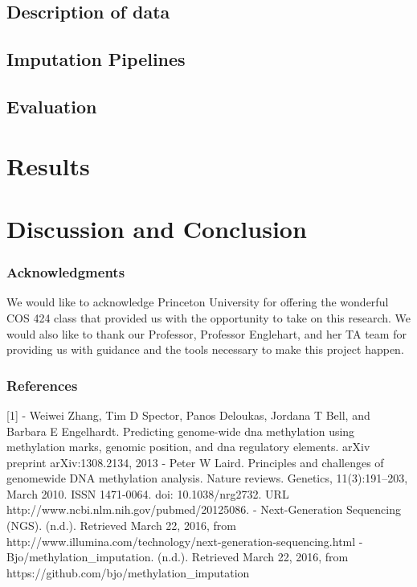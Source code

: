 \documentclass{article} %
\begin{document}
\subsection{Description of data}
\subsection{Imputation Pipelines}
\subsection{Evaluation}
\section{Results}
\section{Discussion and Conclusion}
\subsubsection*{Acknowledgments}
We would like to acknowledge Princeton University for offering the wonderful COS 424 class that provided us with the opportunity to take on this research. We would also like to thank our Professor, Professor Englehart, and her TA team for providing us with guidance and the tools necessary to make this project happen.


\subsubsection*{References}
[1] - Weiwei Zhang, Tim D Spector, Panos Deloukas, Jordana T Bell, and Barbara E Engelhardt. Predicting genome-wide dna methylation using methylation marks, genomic position, and dna regulatory elements. arXiv preprint arXiv:1308.2134, 2013
\newline
\newline
[2] - Peter W Laird. Principles and challenges of genomewide DNA methylation analysis. Nature reviews. Genetics, 11(3):191–203, March 2010. ISSN 1471-0064. doi: 10.1038/nrg2732. URL http://www.ncbi.nlm.nih.gov/pubmed/20125086.
\newline
\newline
[3] - Next-Generation Sequencing (NGS). (n.d.). Retrieved March 22, 2016, from http://www.illumina.com/technology/next-generation-sequencing.html
\newline
\newline
[4] - Bjo/methylation\_imputation. (n.d.). Retrieved March 22, 2016, from https://github.com/bjo/methylation\_imputation
\end{document}
